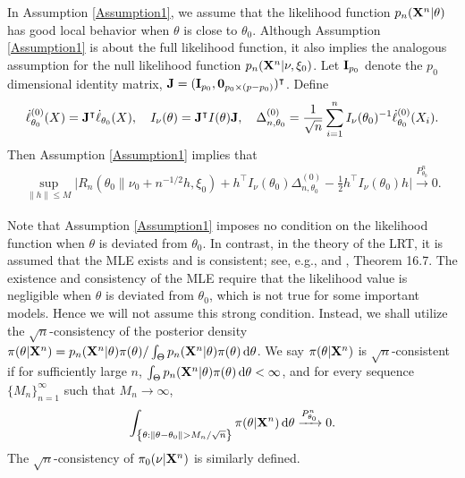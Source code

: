 \documentclass[11pt]{article}
\newcommand{\myT}{\intercal}
\theoremstyle{plain}
\theoremstyle{definition}
\theoremstyle{remark}
\begin{document}
In Assumption \ref{Assumption1}, we assume that the likelihood function $p_n (\mathbf{X}^n | \theta)$ has good local behavior when $\theta$ is close to $\theta_0$.
Although Assumption \ref{Assumption1} is about the full likelihood function, it also implies the analogous assumption for the null likelihood function $p_n (\mathbf{X}^n |\nu, \xi_0)$.
Let 
$\mathbf{I}_{p_0}$ denote the $p_0$ dimensional identity matrix,
$\BJ=(\BI_{p_0},\mathbf{0}_{p_0\times(p-p_0)})^\myT $.
Define
$$
\dot{\ell}_{\theta_0}^{(0)}(X)= \BJ^\myT \dot \ell_{\theta_0}(X)
,
\quad 
I_\nu(\theta)=\BJ^\myT I(\theta) \BJ,\quad 
\Delta_{n,\theta_0}^{(0)}
=\frac{1}{\sqrt{n}}\sum_{i=1}^n I_\nu(\theta_0)^{-1}\dot{\ell}^{(0)}_{\theta_0}(X_i)
.
$$
Then  Assumption \ref{Assumption1} implies that
\begin{align*}
        \sup_{\|h\|\leq M}\Big|
        R_n( \theta_0\|\nu_0 + n^{-1/2 }h, \xi_0 )
        +h^\myT  I_{\nu}(\theta_0)\Delta_{n,\theta_0}^{(0)}-\frac{1}{2}h^\myT  I_\nu (\theta_0) h
        \Big|\xrightarrow{P^n_{\theta_0}}0.
\end{align*}


Note that Assumption \ref{Assumption1} imposes no condition on the likelihood function when $\theta$ is deviated from $\theta_0$.
In contrast, in the theory of the LRT, it is assumed that the MLE exists and is consistent; see, e.g., \cite{Wilks1938The} and \cite{van2000asymptotic}, Theorem 16.7.
The existence and consistency of the MLE require that the likelihood value is negligible when $\theta$ is deviated from $\theta_0$, which is not true for some important models.
Hence we will not assume this strong condition.
Instead, we shall utilize the $\sqrt n$-consistency of the posterior density $\pi(\theta | \mathbf{X}^n) = p_n (\mathbf{X}^n | \theta) \pi (\theta ) / \int_{\Theta} p_n (\mathbf{X}^n | \theta) \pi (\theta) \, \mathrm d \theta $.
We say $\pi(\theta | \mathbf{X}^n)$ is $\sqrt n$-consistent if for sufficiently large $n$, $\int_{\Theta} p_n (\mathbf{X}^n | \theta) \pi (\theta) \, \mathrm d \theta < \infty$, and for every sequence $\{M_n\}_{n=1}^\infty$ such that $M_n \to \infty$,
\begin{align*}
\int_{ \left\{ \theta: \|\theta - \theta_0\| > M_n / \sqrt n \right\}}\pi(\theta | \mathbf{X}^n) \, \mathrm d \theta \xrightarrow{P_{\theta_0}^n} 0.
\end{align*}
    The $\sqrt{n}$-consistency of $\pi_0(\nu | \mathbf{X}^{n})$ is similarly defined.
\end{document}
